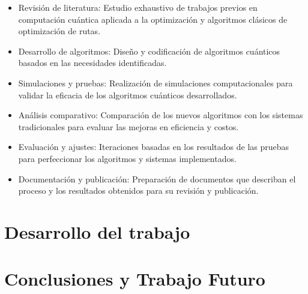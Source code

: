 \documentclass[11pt,a4paper,spanish]{book}
\begin{document}
    \begin{itemize}

        \item Revisión de literatura: Estudio exhaustivo de trabajos previos en computación cuántica aplicada a la optimización y algoritmos clásicos de optimización de rutas.

        \item Desarrollo de algoritmos: Diseño y codificación de algoritmos cuánticos basados en las necesidades identificadas.

        \item Simulaciones y pruebas: Realización de simulaciones computacionales para validar la eficacia de los algoritmos cuánticos desarrollados.

        \item Análisis comparativo: Comparación de los nuevos algoritmos con los sistemas tradicionales para evaluar las mejoras en eficiencia y costos.

        \item Evaluación y ajustes: Iteraciones basadas en los resultados de las pruebas para perfeccionar los algoritmos y sistemas implementados.

        \item Documentación y publicación: Preparación de documentos que describan el proceso y los resultados obtenidos para su revisión y publicación.

    \end{itemize}


    \chapter{Desarrollo del trabajo}

    \chapter{Conclusiones y Trabajo Futuro}
\end{document}
